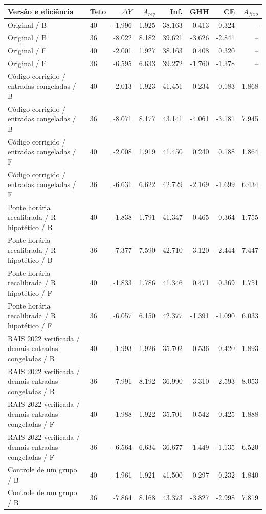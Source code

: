 \begin{tabular}{llrrrrrr}
\hline
Versão e eficiência & Teto & $\Delta Y$ & $A_{req}$ & Inf. & GHH & CE & $A_{fixo}$ \\
\hline
Original / B & 40 & -1.996 & 1.925 & 38.163 & 0.413 & 0.324 & -- \\
Original / B & 36 & -8.022 & 8.182 & 39.621 & -3.626 & -2.841 & -- \\
Original / F & 40 & -2.001 & 1.927 & 38.163 & 0.408 & 0.320 & -- \\
Original / F & 36 & -6.595 & 6.633 & 39.272 & -1.760 & -1.378 & -- \\
Código corrigido / entradas congeladas / B & 40 & -2.013 & 1.923 & 41.451 & 0.234 & 0.183 & 1.868 \\
Código corrigido / entradas congeladas / B & 36 & -8.071 & 8.177 & 43.141 & -4.061 & -3.181 & 7.945 \\
Código corrigido / entradas congeladas / F & 40 & -2.008 & 1.919 & 41.450 & 0.240 & 0.188 & 1.864 \\
Código corrigido / entradas congeladas / F & 36 & -6.631 & 6.622 & 42.729 & -2.169 & -1.699 & 6.434 \\
Ponte horária recalibrada / R hipotético / B & 40 & -1.838 & 1.791 & 41.347 & 0.465 & 0.364 & 1.755 \\
Ponte horária recalibrada / R hipotético / B & 36 & -7.377 & 7.590 & 42.710 & -3.120 & -2.444 & 7.447 \\
Ponte horária recalibrada / R hipotético / F & 40 & -1.833 & 1.786 & 41.346 & 0.471 & 0.369 & 1.751 \\
Ponte horária recalibrada / R hipotético / F & 36 & -6.057 & 6.150 & 42.377 & -1.391 & -1.090 & 6.033 \\
RAIS 2022 verificada / demais entradas congeladas / B & 40 & -1.993 & 1.926 & 35.702 & 0.536 & 0.420 & 1.893 \\
RAIS 2022 verificada / demais entradas congeladas / B & 36 & -7.991 & 8.192 & 36.990 & -3.310 & -2.593 & 8.053 \\
RAIS 2022 verificada / demais entradas congeladas / F & 40 & -1.988 & 1.922 & 35.701 & 0.542 & 0.425 & 1.888 \\
RAIS 2022 verificada / demais entradas congeladas / F & 36 & -6.564 & 6.634 & 36.677 & -1.449 & -1.135 & 6.520 \\
Controle de um grupo / B & 40 & -1.961 & 1.921 & 41.500 & 0.297 & 0.232 & 1.840 \\
Controle de um grupo / B & 36 & -7.864 & 8.168 & 43.373 & -3.827 & -2.998 & 7.819 \\

\end{tabular}
